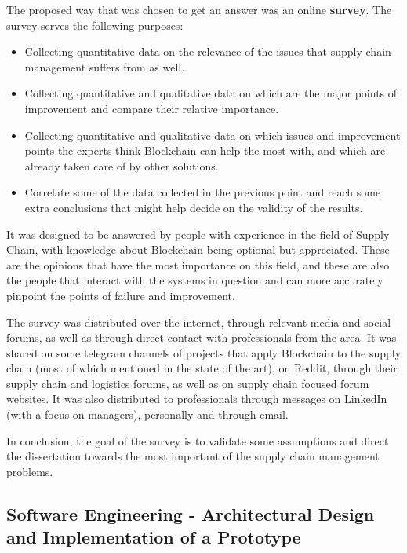 The proposed way that was chosen to get an answer was an online \textbf{survey}. The survey serves the following purposes:
\begin{itemize}
\item Collecting quantitative data on the relevance of the issues that supply chain management suffers from as well. 
\item Collecting quantitative and qualitative data on which are the major points of improvement and compare their relative importance.
\item Collecting quantitative and qualitative data on which issues and improvement points the experts think Blockchain can help the most with, and which are already taken care of by other solutions.
\item Correlate some of the data collected in the previous point and reach some extra conclusions that might help decide on the validity of the results.
\end{itemize}

It was designed to be answered by people with experience in the field of Supply Chain, with knowledge about Blockchain being optional but appreciated. These are the opinions that have the most importance on this field, and these are also the people that interact with the systems in question and can more accurately pinpoint the points of failure and improvement.

The survey was distributed over the internet, through relevant media and social forums, as well as through direct contact with professionals from the area. It was shared on some telegram channels of projects that apply Blockchain to the supply chain (most of which mentioned in the state of the art), on Reddit, through their supply chain and logistics forums, as well as on supply chain focused forum websites. It was also distributed to professionals through messages on LinkedIn (with a focus on managers), personally and through email.

In conclusion, the goal of the survey is to validate some assumptions and direct the dissertation towards the most important of the supply chain management problems.

\subsection{Software Engineering - Architectural Design and Implementation of a Prototype}

